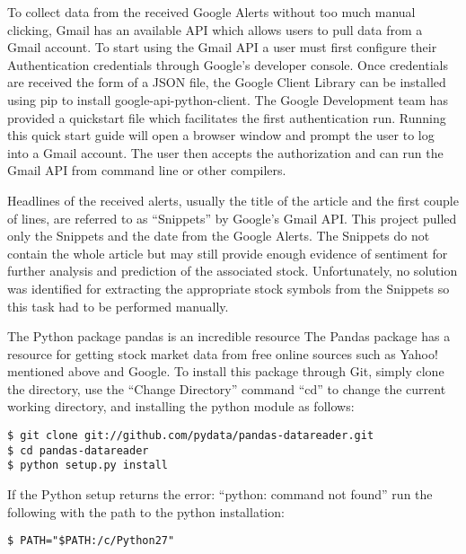 \documentclass[sigconf]{acmart}
\begin{document}
To collect data from the received Google Alerts without too much manual clicking, Gmail has an available API which allows users to pull data from a Gmail account. To start using the Gmail API a user must first configure their Authentication credentials through Google's developer console. Once credentials are received the form of a JSON file, the Google Client Library can be installed using pip to install google-api-python-client. The Google Development team has provided a quickstart file which facilitates the first authentication run. Running this quick start guide will open a browser window and prompt the user to log into a Gmail account. The user then accepts the authorization and can run the Gmail API from command line or other compilers. 

 Headlines of the received alerts, usually the title of the article and the first couple of lines, are referred to as ``Snippets'' by Google's Gmail API. This project pulled only the Snippets and the date from the Google Alerts. The Snippets do not contain the whole article but may still provide enough evidence of sentiment for further analysis and prediction of the associated stock. Unfortunately, no solution was identified for extracting the appropriate stock symbols from the Snippets so this task had to be performed manually. 


The Python package pandas is an incredible resource 
The Pandas package has a resource for getting stock market data from free online sources such as Yahoo! mentioned above and Google. To install this package through Git, simply clone the directory, use the ``Change Directory'' command ``cd'' to change the current working directory, and installing the python module as follows: 

\begin{mdframed}[style=default]
\begin{lstlisting}
$ git clone git://github.com/pydata/pandas-datareader.git
$ cd pandas-datareader
$ python setup.py install
\end{lstlisting}
\end{mdframed}

If the Python setup returns the error: ``python: command not found'' run the following with the path to the python installation:
\begin{mdframed}[style=default]
\begin{lstlisting}
$ PATH="$PATH:/c/Python27"
\end{lstlisting}
\end{mdframed}
\end{document}
